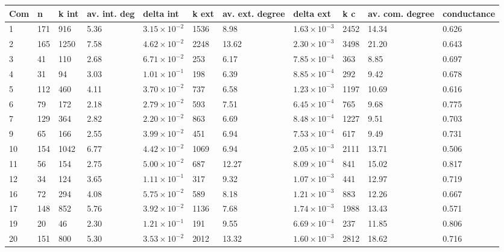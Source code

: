 \begin{table}[ht]
\centering
\begin{adjustbox}{width=\textwidth}

\begin{tabular}{lllllllllll}
  \hline
Com & n & k int & av. int. deg & delta int & k ext & av. ext. degree & delta ext & k c & av. com. degree & conductance \\ 
  \hline
1 & 171 & 916 & 5.36 & $3.15 \times 10^{-2}$ & 1536 & 8.98 & $1.63 \times 10^{-3}$ & 2452 & 14.34 & 0.626 \\ 
  2 & 165 & 1250 & 7.58 & $4.62 \times 10^{-2}$ & 2248 & 13.62 & $2.30 \times 10^{-3}$ & 3498 & 21.20 & 0.643 \\ 
  3 & 41 & 110 & 2.68 & $6.71 \times 10^{-2}$ & 253 & 6.17 & $7.85 \times 10^{-4}$ & 363 & 8.85 & 0.697 \\ 
  4 & 31 & 94 & 3.03 & $1.01 \times 10^{-1}$ & 198 & 6.39 & $8.85 \times 10^{-4}$ & 292 & 9.42 & 0.678 \\ 
  5 & 112 & 460 & 4.11 & $3.70 \times 10^{-2}$ & 737 & 6.58 & $1.23 \times 10^{-3}$ & 1197 & 10.69 & 0.616 \\ 
  6 & 79 & 172 & 2.18 & $2.79 \times 10^{-2}$ & 593 & 7.51 & $6.45 \times 10^{-4}$ & 765 & 9.68 & 0.775 \\ 
  7 & 129 & 364 & 2.82 & $2.20 \times 10^{-2}$ & 863 & 6.69 & $8.48 \times 10^{-4}$ & 1227 & 9.51 & 0.703 \\ 
  9 & 65 & 166 & 2.55 & $3.99 \times 10^{-2}$ & 451 & 6.94 & $7.53 \times 10^{-4}$ & 617 & 9.49 & 0.731 \\ 
  10 & 154 & 1042 & 6.77 & $4.42 \times 10^{-2}$ & 1069 & 6.94 & $2.05 \times 10^{-3}$ & 2111 & 13.71 & 0.506 \\ 
  11 & 56 & 154 & 2.75 & $5.00 \times 10^{-2}$ & 687 & 12.27 & $8.09 \times 10^{-4}$ & 841 & 15.02 & 0.817 \\ 
  12 & 34 & 124 & 3.65 & $1.11 \times 10^{-1}$ & 317 & 9.32 & $1.07 \times 10^{-3}$ & 441 & 12.97 & 0.719 \\ 
  16 & 72 & 294 & 4.08 & $5.75 \times 10^{-2}$ & 589 & 8.18 & $1.21 \times 10^{-3}$ & 883 & 12.26 & 0.667 \\ 
  17 & 148 & 852 & 5.76 & $3.92 \times 10^{-2}$ & 1136 & 7.68 & $1.74 \times 10^{-3}$ & 1988 & 13.43 & 0.571 \\ 
  19 & 20 & 46 & 2.30 & $1.21 \times 10^{-1}$ & 191 & 9.55 & $6.69 \times 10^{-4}$ & 237 & 11.85 & 0.806 \\ 
  20 & 151 & 800 & 5.30 & $3.53 \times 10^{-2}$ & 2012 & 13.32 & $1.60 \times 10^{-3}$ & 2812 & 18.62 & 0.716 \\ 

\end{tabular}
\end{adjustbox}
\end{table}
